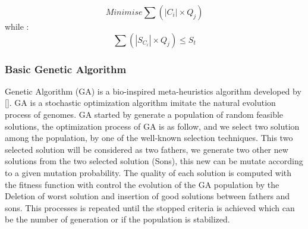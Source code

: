 \documentclass[preprint,12pt]{elsarticle}
\begin{document}
\begin{equation}
Minimise \sum (|C_{i}| \times Q_{j}) 
\end{equation}
while :
\begin{equation}
\sum (|S_{C_{i}}| \times Q_{j}) \leqslant S_{t} 
\end{equation}
\subsubsection{Basic Genetic Algorithm}
Genetic Algorithm (GA) is a bio-inspired meta-heuristics algorithm developed by []. GA is a stochastic optimization algorithm imitate the natural evolution process of genomes. GA started by generate a population of random feasible solutions, the optimization process of GA is as follow, and we select two solution among the population, by one of the well-known selection techniques. This two selected solution will be considered as two fathers, we generate two other new solutions from the two selected solution (Sons), this new can be mutate according to a given mutation probability. The quality of each solution is computed with the fitness function with control the evolution of the GA population by the Deletion of worst solution and insertion of good solutions between fathers and sons. This processes is repeated until the stopped criteria is achieved which can be the number of generation or if the population is stabilized.
\end{document}
